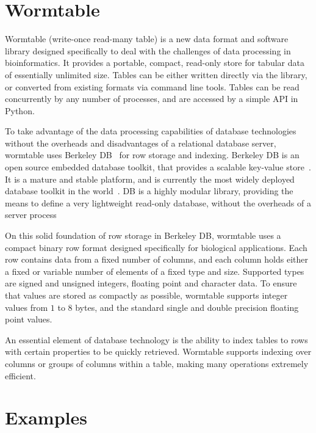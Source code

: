 \documentclass{bioinfo}
\begin{document}

\section{Wormtable}
Wormtable (write-once read-many table) 
is a new data format and software library designed specifically
to deal with the challenges of data processing in bioinformatics.
It provides a portable, compact, read-only store for tabular
data of essentially unlimited size. Tables can
be either written directly via the library, or converted
from existing formats via command line tools. Tables can be read 
concurrently by any number of processes, and are accessed by a 
simple API in Python.

To take advantage of the data processing capabilities of database
technologies without the overheads and disadvantages of a relational database 
server, wormtable uses Berkeley DB~\citep{obs99} for row storage and indexing.
Berkeley DB is an open source embedded database toolkit, that provides a
scalable key-value store~\citep{m12}. It is a mature and stable platform, 
and is currently the most widely deployed database toolkit in the 
world~\citep{sb12}. DB is a highly modular library, providing the  %
means to define a very lightweight read-only database, without the 
overheads of a server process

On this solid foundation of row storage in Berkeley DB, wormtable uses a
compact binary row format designed specifically for biological applications.
Each row contains data from a fixed number of columns, and each column 
holds either a fixed or variable number of elements of a fixed type and size.
Supported types are signed and unsigned integers, 
floating point and character data. To ensure that values are 
stored as compactly as possible, wormtable supports integer values from 
$1$ to $8$ bytes, and the standard single and double precision 
floating point values. 

An essential element of database technology is the ability to index tables
to rows with certain properties to be quickly retrieved. Wormtable 
supports indexing over columns or groups of columns within a table, 
making many operations extremely efficient. 

\section{Examples}
\end{document}
